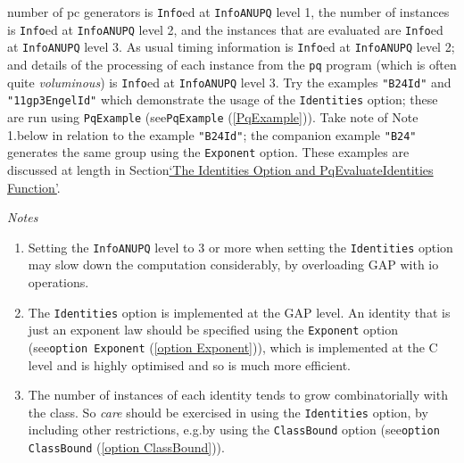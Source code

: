 \documentclass[a4paper,11pt]{report}
\begin{document}
{{\begin{description}
number of pc generators is \texttt{Info}\texttt{}ed at \texttt{InfoANUPQ} level 1, the number of instances is \texttt{Info}\texttt{}ed at \texttt{InfoANUPQ} level 2, and the instances that are evaluated are \texttt{Info}\texttt{}ed at \texttt{InfoANUPQ} level 3. As usual timing information is \texttt{Info}\texttt{}ed at \texttt{InfoANUPQ} level 2; and details of the processing of each instance from the \texttt{pq} program (which is often quite \emph{voluminous}) is \texttt{Info}\texttt{}ed at \texttt{InfoANUPQ} level 3. Try the examples \texttt{"B2\texttt{}4\texttt{}Id"} and \texttt{"11gp\texttt{}3\texttt{}Engel\texttt{}Id"} which demonstrate the usage of the \texttt{Identities} option; these are run using \texttt{PqExample} (see{\nobreakspace}\texttt{PqExample} (\ref{PqExample})). Take note of Note 1.{\nobreakspace}below in relation to the example \texttt{"B2\texttt{}4\texttt{}Id"}; the companion example \texttt{"B2\texttt{}4"} generates the same group using the \texttt{Exponent} option. These examples are discussed at length in Section{\nobreakspace}\hyperref[The Identities Option and PqEvaluateIdentities Function]{`The Identities Option and PqEvaluateIdentities Function'}. 

 \emph{Notes} 
\begin{enumerate}
\item  Setting the \texttt{InfoANUPQ} level to 3 or more when setting the \texttt{Identities} option may slow down the computation considerably, by overloading \textsf{GAP} with io operations. 
\item  The \texttt{Identities} option is implemented at the \textsf{GAP} level. An identity that is just an exponent law should be specified using the \texttt{Exponent} option (see{\nobreakspace}\texttt{option Exponent} (\ref{option Exponent})), which is implemented at the C level and is highly optimised and so is much
more efficient. 
\item  The number of instances of each identity tends to grow combinatorially with
the class. So \emph{care} should be exercised in using the \texttt{Identities} option, by including other restrictions, e.g.{\nobreakspace}by using the \texttt{ClassBound} option (see{\nobreakspace}\texttt{option ClassBound} (\ref{option ClassBound})). 
\end{enumerate}
 

\end{description}}}
\end{document}
